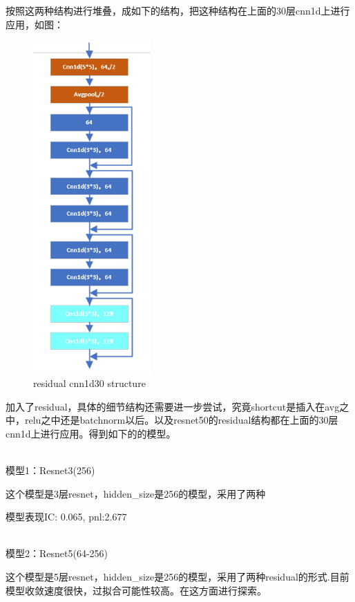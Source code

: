 \documentclass[11pt]{ctexart}
\begin{document}
按照这两种结构进行堆叠，成如下的结构，把这种结构在上面的30层cnn1d上进行应用，如图：
\begin{figure}[H]

\begin{center}
\includegraphics[width=0.4\textwidth]{residual2.PNG}
\end{center}
\caption{residual cnn1d30 structure}
\label{FIG.2}
\end{figure}

加入了residual，具体的细节结构还需要进一步尝试，究竟shortcut是插入在avg之中，relu之中还是batchnorm以后。以及resnet50的residual结构都在上面的30层cnn1d上进行应用。得到如下的的模型。

~\\
模型1：Resnet3(256)

这个模型是3层resnet，hidden\_size是256的模型，采用了两种

模型表现{\kaishu \small IC: 0.065, pnl:2.677}

~\\
模型2：Resnet5(64-256)

这个模型是5层resnet，hidden\_size是256的模型，采用了两种residual的形式.目前模型收敛速度很快，过拟合可能性较高。在这方面进行探索。
\end{document}
